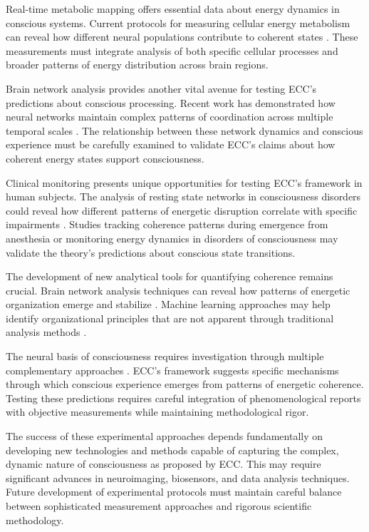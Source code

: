 \begin{refsection}
Real-time metabolic mapping offers essential data about energy dynamics in conscious systems. Current protocols for measuring cellular energy metabolism can reveal how different neural populations contribute to coherent states \cite{Zhang2019}. These measurements must integrate analysis of both specific cellular processes and broader patterns of energy distribution across brain regions. 

Brain network analysis provides another vital avenue for testing ECC's predictions about conscious processing. Recent work has demonstrated how neural networks maintain complex patterns of coordination across multiple temporal scales \cite{Palva2018}. The relationship between these network dynamics and conscious experience must be carefully examined to validate ECC's claims about how coherent energy states support consciousness.

Clinical monitoring presents unique opportunities for testing ECC's framework in human subjects. The analysis of resting state networks in consciousness disorders could reveal how different patterns of energetic disruption correlate with specific impairments \cite{Fox2010}. Studies tracking coherence patterns during emergence from anesthesia or monitoring energy dynamics in disorders of consciousness may validate the theory's predictions about conscious state transitions.

The development of new analytical tools for quantifying coherence remains crucial. Brain network analysis techniques can reveal how patterns of energetic organization emerge and stabilize \cite{DePasquale2020}. Machine learning approaches may help identify organizational principles that are not apparent through traditional analysis methods \cite{Buzsaki2019}.

The neural basis of consciousness requires investigation through multiple complementary approaches \cite{Kucyi2017}. ECC's framework suggests specific mechanisms through which conscious experience emerges from patterns of energetic coherence. Testing these predictions requires careful integration of phenomenological reports with objective measurements while maintaining methodological rigor.

The success of these experimental approaches depends fundamentally on developing new technologies and methods capable of capturing the complex, dynamic nature of consciousness as proposed by ECC. This may require significant advances in neuroimaging, biosensors, and data analysis techniques. Future development of experimental protocols must maintain careful balance between sophisticated measurement approaches and rigorous scientific methodology.


\end{refsection}
